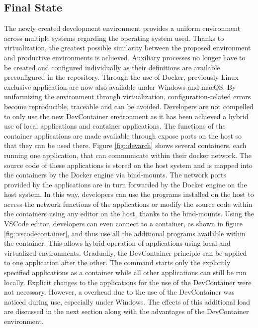         \subsection{Final State}\label{sec::final}
        
        The newly created development environment provides a uniform environment across multiple systems regarding the operating system used. Thanks to virtualization, the greatest possible similarity between the proposed environment and productive environments is achieved. Auxiliary processes no longer have to be created and configured individually as their definitions are available preconfigured in the repository. Through the use of Docker, previously Linux exclusive application are now also available under Windows and macOS. By uniformizing the environment through virtualization, configuration-related errors become reproducible, traceable and can be avoided.\newline
        Developers are not compelled to only use the new DevContainer environment as it has been achieved a hybrid use of local applications and container applications. The functions of the container applications are made available through expose ports on the host so that they can be used there. Figure \ref{fig::devarch} shows several containers, each running one application, that can communicate within their docker network. The source code of these applications is stored on the host system and is mapped into the containers by the Docker engine via bind-mounts. The network ports provided by the applications are in turn forwarded by the Docker engine on the host system. In this way, developers can use the programs installed on the host to access the network functions of the applications or modify the source code within the containers using any editor on the host, thanks to the bind-mounts. Using the VSCode editor, developers can even connect to a container, as shown in figure \ref{fig::vscodecontainer}, and thus use all the additional programs available within the container.\newline
        This allows hybrid operation of applications using local and virtualized environments. Gradually, the DevContainer principle can be applied to one application after the other. The command  starts only the explicitly specified applications as a container while all other applications can still be run locally. Explicit changes to the applications for the use of the DevContainer were not necessary.\newline
        However, a overhead due to the use of the DevContainer was noticed during use, especially under Windows. The effects of this additional load are discussed in the next section along with the advantages of the DevContainer environment.

